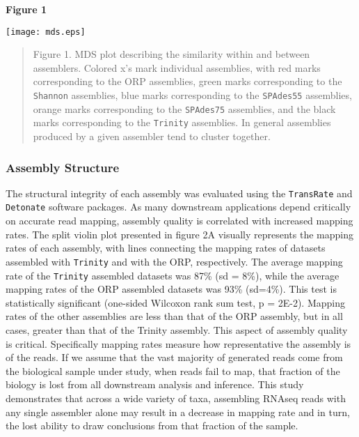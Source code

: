 \documentclass[10pt,letterpaper]{article}
\begin{document}
\newpage
\textbf{\hypertarget{Figure 1}{Figure 1}} \\
\centerline{\texttt{[image: mds.eps]}}
\begin{quote}
\small{Figure 1. MDS plot describing the similarity within and between assemblers. Colored x's mark individual assemblies, with red marks corresponding to the ORP assemblies, green marks corresponding to the \texttt{Shannon} assemblies, blue marks corresponding to the \texttt{SPAdes55} assemblies, orange marks corresponding to the \texttt{SPAdes75} assemblies, and the black marks corresponding to the \texttt{Trinity} assemblies. In general assemblies produced by a given assembler tend to cluster together.}
\end{quote} 

  

\subsubsection{Assembly Structure}

The structural integrity of each assembly was evaluated using the \texttt{TransRate} and \texttt{Detonate} software packages. As many downstream applications depend critically on accurate read mapping, assembly quality is correlated with increased mapping rates. The split violin plot presented in figure 2A visually represents the mapping rates of each assembly, with lines connecting the mapping rates of datasets assembled with \texttt{Trinity} and with the ORP, respectively. The average mapping rate of the \texttt{Trinity} assembled datasets was 87\% (sd = 8\%), while the average mapping rates of the ORP assembled datasets was 93\% (sd=4\%). This test is statistically significant (one-sided Wilcoxon rank sum test, p = 2E-2). Mapping rates of the other assemblies are less than that of the ORP assembly, but in all cases, greater than that of the Trinity assembly. This aspect of assembly quality is critical. Specifically mapping rates measure how representative the assembly is of the reads. If we assume that the vast majority of generated reads come from the biological sample under study, when reads fail to map, that fraction of the biology is lost from all downstream analysis and inference. This study demonstrates that across a wide variety of taxa, assembling RNAseq reads with any single assembler alone may result in a decrease in mapping rate and in turn, the lost ability to draw conclusions from that fraction of the sample. 
\end{document}
